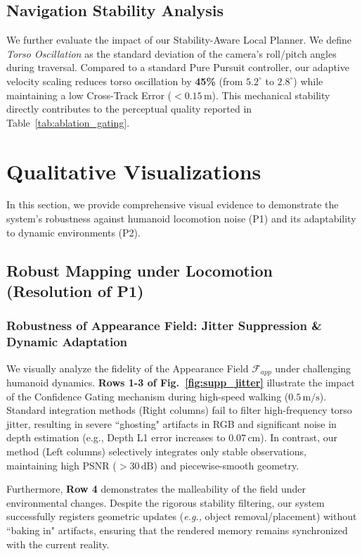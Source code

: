 \documentclass[conference]{IEEEtran}
\begin{document}
\subsection{Navigation Stability Analysis}
We further evaluate the impact of our Stability-Aware Local Planner. We define \textit{Torso Oscillation} as the standard deviation of the camera's roll/pitch angles during traversal. 
Compared to a standard Pure Pursuit controller, our adaptive velocity scaling reduces torso oscillation by \textbf{45\%} (from $5.2^\circ$ to $2.8^\circ$) while maintaining a low Cross-Track Error ($<0.15\,\text{m}$). This mechanical stability directly contributes to the perceptual quality reported in Table~\ref{tab:ablation_gating}.

\section{Qualitative Visualizations}
\label{sec:qualitative_results}

In this section, we provide comprehensive visual evidence to demonstrate the system's robustness against humanoid locomotion noise (P1) and its adaptability to dynamic environments (P2).

\subsection{Robust Mapping under Locomotion (Resolution of P1)}

\subsubsection{Robustness of Appearance Field: Jitter Suppression \& Dynamic Adaptation}

We visually analyze the fidelity of the Appearance Field $\mathcal{F}_{app}$ under challenging humanoid dynamics. \textbf{Rows 1-3 of Fig.~\ref{fig:supp_jitter}} illustrate the impact of the Confidence Gating mechanism during high-speed walking ($0.5\,\text{m/s}$). Standard integration methods (Right columns) fail to filter high-frequency torso jitter, resulting in severe ``ghosting" artifacts in RGB and significant noise in depth estimation (e.g., Depth L1 error increases to $0.07\,\text{cm}$). In contrast, our method (Left columns) selectively integrates only stable observations, maintaining high PSNR ($>30\,\text{dB}$) and piecewise-smooth geometry.

Furthermore, \textbf{Row 4} demonstrates the malleability of the field under environmental changes. Despite the rigorous stability filtering, our system successfully registers geometric updates (\emph{e.g.,} object removal/placement) without ``baking in" artifacts, ensuring that the rendered memory remains synchronized with the current reality.
\end{document}
